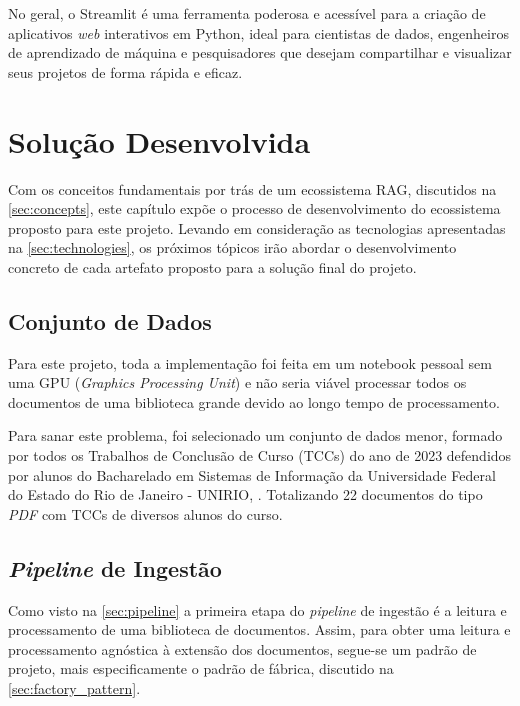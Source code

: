 \documentclass[a4paper, 12pt]{article}
\newcommand{\citeb}[1]{\bibleftbracket\cite{#1}\bibrightbracket}
\begin{document}
    No geral, o Streamlit é uma ferramenta poderosa e acessível para a criação de aplicativos \textit{web} interativos em Python, ideal para cientistas de dados, engenheiros de aprendizado de máquina e pesquisadores que desejam compartilhar e visualizar seus projetos de forma rápida e eficaz.

    \clearpage

    \section{Solução Desenvolvida}

    Com os conceitos fundamentais por trás de um ecossistema RAG, discutidos na \autoref{sec:concepts}, este capítulo expõe o processo de desenvolvimento do ecossistema proposto para este projeto. Levando em consideração as tecnologias apresentadas na \autoref{sec:technologies}, os próximos tópicos irão abordar o desenvolvimento concreto de cada artefato proposto para a solução final do projeto.

    \subsection{Conjunto de Dados} \label{sec:data}

    Para este projeto, toda a implementação foi feita em um notebook pessoal sem uma GPU (\textit{Graphics Processing Unit}) e não seria viável processar todos os documentos de uma biblioteca grande devido ao longo tempo de processamento. 
    
    Para sanar este problema, foi selecionado um conjunto de dados menor, formado por todos os Trabalhos de Conclusão de Curso (TCCs) do ano de 2023 defendidos por alunos do Bacharelado em Sistemas de Informação da Universidade Federal do Estado do Rio de Janeiro - UNIRIO, \citeb{tccs_unirio}. Totalizando 22 documentos do tipo \textit{PDF} com TCCs de diversos alunos do curso.    

    \subsection{\textit{Pipeline} de Ingestão}
    
    Como visto na \autoref{sec:pipeline} a primeira etapa do \textit{pipeline} de ingestão é a leitura e processamento de uma biblioteca de documentos. Assim, para obter uma leitura e processamento agnóstica à extensão dos documentos, segue-se  um padrão de projeto, mais especificamente o padrão de fábrica, discutido na \autoref{sec:factory_pattern}.
\end{document}
